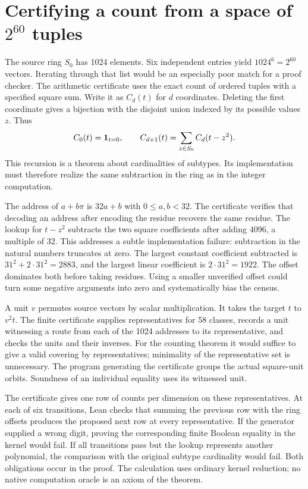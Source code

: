 \documentclass[12pt,letterpaper]{article}
\begin{document}
\section[Certifying a count of six-tuples]{Certifying a count from a space of $2^{60}$ tuples}
The source ring $S_0$ has 1024 elements. Six independent entries yield $1024^6=2^{60}$ vectors. Iterating through that list would be an especially poor match for a proof checker. The arithmetic certificate uses the exact count of ordered tuples with a specified square sum. Write it as $C_d(t)$ for $d$ coordinates. Deleting the first coordinate gives a bijection with the disjoint union indexed by its possible values $z$. Thus
\[
 C_0(t)={\bf1}_{t=0},\qquad C_{d+1}(t)=\sum_{z\in S_0}C_d(t-z^2).
\]
This recursion is a theorem about cardinalities of subtypes. Its implementation must therefore realize the same subtraction in the ring as in the integer computation.
\par
The address of $a+b\pi$ is $32a+b$ with $0\leq a,b<32$. The certificate verifies that decoding an address after encoding the residue recovers the same residue. The lookup for $t-z^2$ subtracts the two square coefficients after adding $4096$, a multiple of $32$. This addresses a subtle implementation failure: subtraction in the natural numbers truncates at zero. The largest constant coefficient subtracted is $31^2+2\cdot31^2=2883$, and the largest linear coefficient is $2\cdot31^2=1922$. The offset dominates both before taking residues. Using a smaller unverified offset could turn some negative arguments into zero and systematically bias the census.
\par
A unit $v$ permutes source vectors by scalar multiplication. It takes the target $t$ to $v^2t$. The finite certificate supplies representatives for 58 classes, records a unit witnessing a route from each of the 1024 addresses to its representative, and checks the units and their inverses. For the counting theorem it would suffice to give a valid covering by representatives; minimality of the representative set is unnecessary. The program generating the certificate groups the actual square-unit orbits. Soundness of an individual equality uses its witnessed unit.
\par
The certificate gives one row of counts per dimension on these representatives. At each of six transitions, Lean checks that summing the previous row with the ring offsets produces the proposed next row at every representative. If the generator supplied a wrong digit, proving the corresponding finite Boolean equality in the kernel would fail. If all transitions pass but the lookup represents another polynomial, the comparison with the original subtype cardinality would fail. Both obligations occur in the proof. The calculation uses ordinary kernel reduction; no native computation oracle is an axiom of the theorem.
\end{document}
